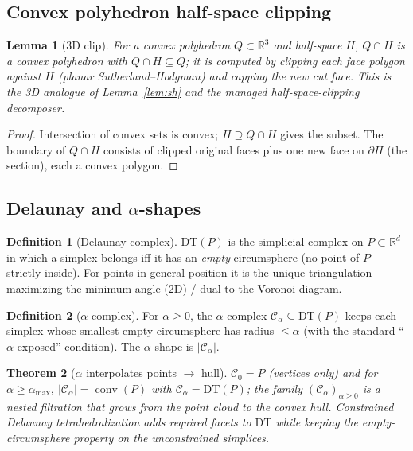 \documentclass[11pt]{article}
\theoremstyle{definition}\newtheorem{definition}{Definition}[section]
\theoremstyle{plain}\newtheorem{theorem}{Theorem}[section]
\newtheorem{lemma}[theorem]{Lemma}\newtheorem{proposition}[theorem]{Proposition}
\newcommand{\R}{\mathbb{R}}\newcommand{\Z}{\mathbb{Z}}\newcommand{\Norm}[1]{\lVert #1\rVert}
\DeclareMathOperator{\conv}{conv}\DeclareMathOperator*{\argmin}{arg\,min}
\begin{document}
\subsection{Convex polyhedron half-space clipping}
\begin{lemma}[3D clip]\label{lem:clip3d}
For a convex polyhedron $Q\subset\R^3$ and half-space $H$, $Q\cap H$ is a convex polyhedron with
$Q\cap H\subseteq Q$; it is computed by clipping each face polygon against $H$ (planar Sutherland--Hodgman)
and capping the new cut face. This is the 3D analogue of Lemma~\ref{lem:sh} and the managed
half-space-clipping decomposer.
\end{lemma}
\begin{proof}
Intersection of convex sets is convex; $H\supseteq Q\cap H$ gives the subset. The boundary of $Q\cap H$
consists of clipped original faces plus one new face on $\partial H$ (the section), each a convex polygon.
\end{proof}

\subsection{Delaunay and $\alpha$-shapes}
\begin{definition}[Delaunay complex]
$\mathrm{DT}(P)$ is the simplicial complex on $P\subset\R^d$ in which a simplex belongs iff it has an
\emph{empty} circumsphere (no point of $P$ strictly inside). For points in general position it is the unique
triangulation maximizing the minimum angle (2D) / dual to the Voronoi diagram.
\end{definition}
\begin{definition}[$\alpha$-complex]
For $\alpha\ge0$, the $\alpha$-complex $\mathcal C_\alpha\subseteq\mathrm{DT}(P)$ keeps each simplex whose
smallest empty circumsphere has radius $\le\alpha$ (with the standard ``$\alpha$-exposed'' condition). The
$\alpha$-shape is $|\mathcal C_\alpha|$.
\end{definition}
\begin{theorem}[$\alpha$ interpolates points $\to$ hull]
$\mathcal C_0=P$ (vertices only) and for $\alpha\ge\alpha_{\max}$, $|\mathcal C_\alpha|=\conv(P)$ with
$\mathcal C_\alpha=\mathrm{DT}(P)$; the family $(\mathcal C_\alpha)_{\alpha\ge0}$ is a nested filtration that
grows from the point cloud to the convex hull. Constrained Delaunay tetrahedralization adds required facets to
$\mathrm{DT}$ while keeping the empty-circumsphere property on the unconstrained simplices.
\end{theorem}
\end{document}
